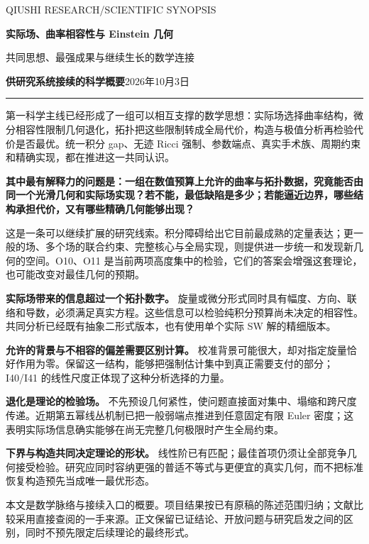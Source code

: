 \documentclass[11pt,a4paper]{article}
\newcommand{\key}[1]{\textbf{\color{ink}#1}}
\newcommand{\subhead}[1]{\par\medskip{\sffamily\bfseries\color{ink}#1}\par}
\begin{document}
\thispagestyle{empty}
{\sffamily\color{muted}\small QIUSHI RESEARCH\quad /\quad SCIENTIFIC SYNOPSIS}
\vspace{7mm}

{\sffamily\bfseries\color{ink}\LARGE 实际场、曲率相容性与 Einstein 几何}

{\sffamily\Large 共同思想、最强成果与继续生长的数学连接}

\vspace{3mm}
\key{供研究系统接续的科学概要}\hfill 2026年10月3日

\vspace{3mm}\hrule\vspace{3mm}

第一科学主线已经形成了一组可以相互支撑的数学思想：实际场选择曲率结构，微分相容性限制几何退化，拓扑把这些限制转成全局代价，构造与极值分析再检验代价是否最优。统一积分 gap、无迹 Ricci 强制、参数端点、真实手术族、周期约束和精确实现，都在推进这一共同认识。

\key{其中最有解释力的问题是：一组在数值预算上允许的曲率与拓扑数据，究竟能否由同一个光滑几何和实际场实现？若不能，最低缺陷是多少；若能逼近边界，哪些结构承担代价，又有哪些精确几何能够出现？}

这是一条可以继续扩展的研究线索。积分障碍给出它目前最成熟的定量表达；更一般的场、多个场的联合约束、完整核心与全局实现，则提供进一步统一和发现新几何的空间。O10、O11 是当前两项高度集中的检验，它们的答案会增强这套理论，也可能改变对最佳几何的预期。

\subhead{当前最值得保存的整体认识}

\textbf{实际场带来的信息超过一个拓扑数字。} 旋量或微分形式同时具有幅度、方向、联络和导数，必须满足真实方程。这些信息可以检验纯积分预算尚未决定的相容性。共同分析已经既有抽象二形式版本，也有使用单个实际 SW 解的精细版本。

\textbf{允许的背景与不相容的偏差需要区别计算。} 校准背景可能很大，却对指定旋量恰好作用为零。保留这一结构，能够把强制估计集中到真正需要支付的部分；I40/I41 的线性尺度正体现了这种分析选择的力量。

\textbf{退化是理论的检验场。} 不先预设几何紧性，使问题直接面对集中、塌缩和跨尺度传递。近期第五幂线丛机制已把一般弱端点推进到任意固定有限 Euler 密度；这表明实际场信息确实能够在尚无完整几何极限时产生全局约束。

\textbf{下界与构造共同决定理论的形状。} 线性阶已有匹配；最佳首项仍须让全部竞争几何接受检验。研究应同时容纳更强的普适不等式与更便宜的真实几何，而不把标准恢复构造预先当成唯一最优形态。

\vfill
{\small\color{muted}本文是数学脉络与接续入口的概要。项目结果按已有原稿的陈述范围归纳；文献比较采用直接查阅的一手来源。正文保留已证结论、开放问题与研究启发之间的区别，同时不预先限定后续理论的最终形式。}
\end{document}
